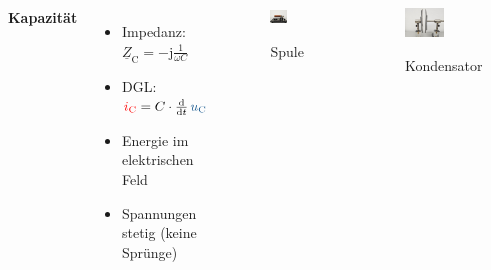 \begin{frame}
{\begin{columns}
    \textbf{Kapazität}%
    \begin{itemize}
        \item Impedanz: $\underline{Z}_{\mathrm C} = -\mathrm{j}\frac{1}{\omega C}$
        \item DGL: $\eci{i_{\mathrm C}} = C \cdot \frac{\d}{\d t}\, \ecv{u_{\mathrm C}}$
        \item Energie im elektrischen Feld
        \item Spannungen stetig (keine Sprünge)
    \end{itemize}

\centering
    \vspace{2cm}

    \begin{figure}[H]\centering
        \includegraphics[width=0.5\textwidth]{./Bilder/Spule.png}
        \par Spule
    \end{figure}
    \begin{figure}\centering
        \includegraphics[width=0.5\textwidth]{./Bilder/Kondensator.png}
        \par Kondensator
    \end{figure}
\end{columns}
}%
\end{frame}

